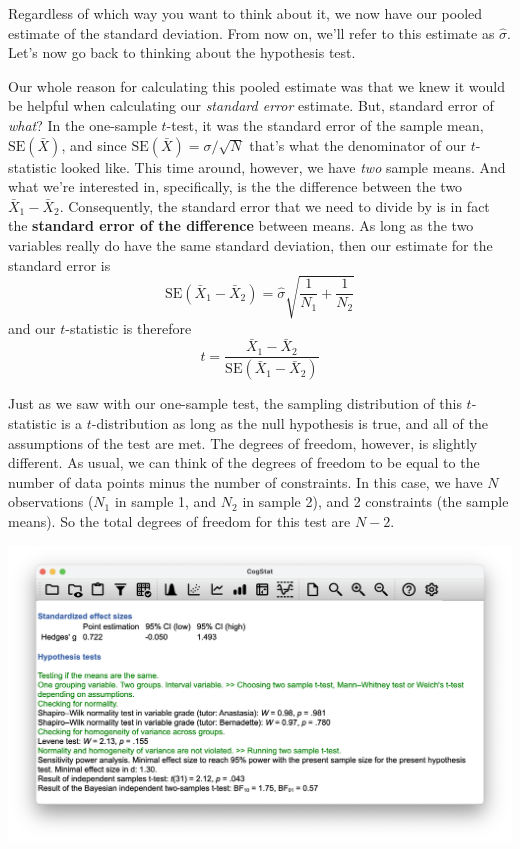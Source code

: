 \documentclass[
]{book}
\theoremstyle{definition}
\theoremstyle{definition}
\theoremstyle{definition}
\theoremstyle{definition}
\theoremstyle{remark}
\begin{document}
Regardless of which way you want to think about it, we now have our pooled estimate of the standard deviation. From now on, we'll refer to this estimate as \(\hat\sigma\). Let's now go back to thinking about the hypothesis test.

Our whole reason for calculating this pooled estimate was that we knew it would be helpful when calculating our \emph{standard error} estimate. But, standard error of \emph{what}? In the one-sample \(t\)-test, it was the standard error of the sample mean, \(\mbox{SE}({\bar{X}})\), and since \(\mbox{SE}({\bar{X}}) = \sigma / \sqrt{N}\) that's what the denominator of our \(t\)-statistic looked like. This time around, however, we have \emph{two} sample means. And what we're interested in, specifically, is the the difference between the two \(\bar{X}_1 - \bar{X}_2\). Consequently, the standard error that we need to divide by is in fact the \textbf{standard error of the difference} between means. As long as the two variables really do have the same standard deviation, then our estimate for the standard error is
\[
\mbox{SE}({\bar{X}_1 - \bar{X}_2}) = \hat\sigma \sqrt{\frac{1}{N_1} + \frac{1}{N_2}}
\]
and our \(t\)-statistic is therefore
\[
t = \frac{\bar{X}_1 - \bar{X}_2}{\mbox{SE}({\bar{X}_1 - \bar{X}_2})}
\]

Just as we saw with our one-sample test, the sampling distribution of this \(t\)-statistic is a \(t\)-distribution as long as the null hypothesis is true, and all of the assumptions of the test are met. The degrees of freedom, however, is slightly different. As usual, we can think of the degrees of freedom to be equal to the number of data points minus the number of constraints. In this case, we have \(N\) observations (\(N_1\) in sample 1, and \(N_2\) in sample 2), and 2 constraints (the sample means). So the total degrees of freedom for this test are \(N-2\).

\begin{center}\includegraphics[width=0.66\linewidth]{resources/image/cogstatharpohypo} \end{center}
\end{document}

